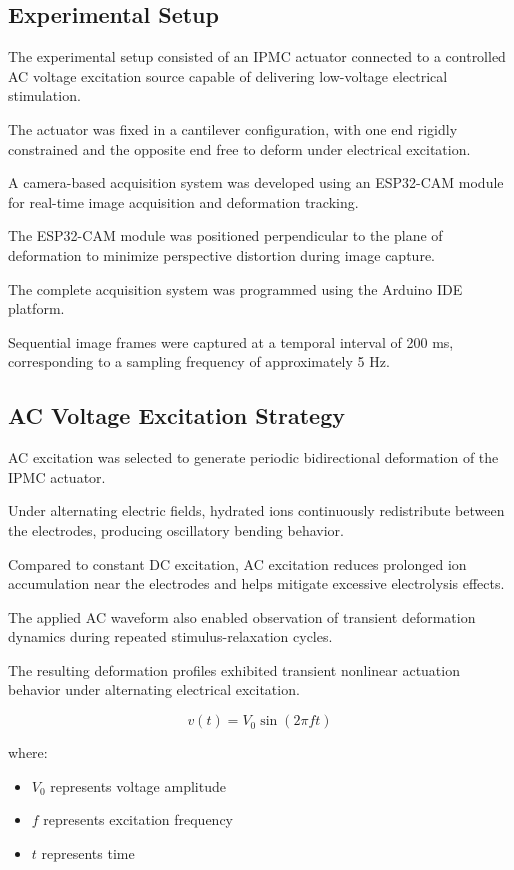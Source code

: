 \documentclass[11pt,a4paper]{article}
\begin{document}
\subsection{Experimental Setup}

The experimental setup consisted of an IPMC actuator connected to a controlled AC voltage excitation source capable of delivering low-voltage electrical stimulation.

The actuator was fixed in a cantilever configuration, with one end rigidly constrained and the opposite end free to deform under electrical excitation.

A camera-based acquisition system was developed using an ESP32-CAM module for real-time image acquisition and deformation tracking.

The ESP32-CAM module was positioned perpendicular to the plane of deformation to minimize perspective distortion during image capture.

The complete acquisition system was programmed using the Arduino IDE platform.

Sequential image frames were captured at a temporal interval of 200 ms, corresponding to a sampling frequency of approximately 5 Hz.

\subsection{AC Voltage Excitation Strategy}

AC excitation was selected to generate periodic bidirectional deformation of the IPMC actuator.

Under alternating electric fields, hydrated ions continuously redistribute between the electrodes, producing oscillatory bending behavior.

Compared to constant DC excitation, AC excitation reduces prolonged ion accumulation near the electrodes and helps mitigate excessive electrolysis effects.

The applied AC waveform also enabled observation of transient deformation dynamics during repeated stimulus-relaxation cycles.

The resulting deformation profiles exhibited transient nonlinear actuation behavior under alternating electrical excitation.

\begin{equation}
v(t) = V_0 \sin(2\pi f t)
\end{equation}

where:

\begin{itemize}

\item $V_0$ represents voltage amplitude

\item $f$ represents excitation frequency

\item $t$ represents time

\end{itemize}
\end{document}
